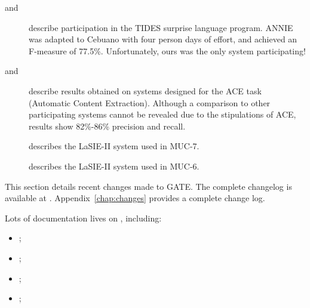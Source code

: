 \begin{description}
\item[\cite{May03d} and \cite{May03g}] describe participation in the
TIDES surprise language program. ANNIE was adapted to Cebuano with four person days
of effort, and achieved an F-measure of 77.5\%. Unfortunately, ours was the only
system participating!

\item[\cite{Maynard02} and \cite{Maynard03}] describe results obtained on
systems designed for the ACE task (Automatic Content Extraction). Although a comparison
to other participating systems cannot be revealed due to the stipulations of ACE,
results show 82\%-86\% precision and recall.

\item[\cite{Hum98a}] describes the LaSIE-II system used in MUC-7.

\item[\cite{Gai95b}] describes the LaSIE-II system used in MUC-6.

\end{description}


This section details recent changes made to GATE.
\ifprintedbook
  The complete changelog is available at .
\else
  Appendix~\ref{chap:changes} provides a complete change log.
\fi

\nestedtrue



\nestedfalse


Lots of documentation lives on 
, including:
\begin{itemize}
\item {};

\item {};

\item {};

\item {};
\end{itemize}

